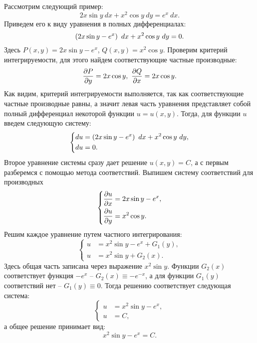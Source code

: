     	Рассмотрим следующий пример:
    	\[ 2x \sin{y} ~ dx + x^2 \cos{y} ~ dy = e^{x} ~ dx. \]
    	Приведем его к виду уравнения в полных дифференциалах:
    	\[ \left( 2x \sin{y} - e^{x} \right) ~ dx + x^2 \cos{y} ~ dy = 0. \]
    	Здесь $P(x, y) = 2x \sin{y} - e^{x}$, $Q(x, y) = x^2 \cos{y}$. Проверим критерий интегрируемости, для этого найдем соответствующие частные производные:
    	\[ \dfrac{\partial P}{\partial y} = 2x \cos{y}, ~ \dfrac{\partial Q}{\partial x} = 2x \cos{y}. \]
    	Как видим, критерий интегрируемости выполняется, так как соответствующие частные производные равны, а значит левая часть уравнения представляет собой полный дифференциал некоторой функции $u = u(x, y)$. Тогда, для функции $u$ введем следующую систему:
    	\[ \left\lbrace \begin{split}
			du &= \left( 2x \sin{y} - e^{x} \right) ~ dx + x^2 \cos{y} ~ dy, \\
			du &= 0.
		\end{split} \right. \]
		Второе уравнение системы сразу дает решение $u(x, y) = C$, а с первым разберемся с помощью метода соответствий. Выпишем систему соответствий для производных
		\[ \left\lbrace \begin{split} 
			\dfrac{\partial u}{\partial x} &= 2x \sin{y} - e^{x}, \\ 
			\dfrac{\partial u}{\partial y} &= x^2 \cos{y}.
		\end{split} \right. \]
		Решим каждое уравнение путем частного интегрирования:
		\[ \left\lbrace \begin{split} 
			u &= x^2 \sin{y} - e^{x} + G_1(y), \\ 
			u &= x^2 \sin{y} + G_2(x).
		\end{split} \right. \]
		Здесь общая часть записана через выражение $x^2 \sin{y}$. Функции $G_2(x)$ соответствует функция $-e^{x}$ -- $G_2(x) \equiv -e^{-x}$, а для функции $G_1(y)$ соответствий нет -- $G_1(y) \equiv 0$. Тогда решению соответствует следующая система:
		\[ \left\lbrace \begin{split} u &= x^2 \sin{y} - e^{x}, \\ u &= C, \end{split} \right. \]
		а общее решение принимает вид:
		\[ x^2 \sin{y} - e^x = C. \]

